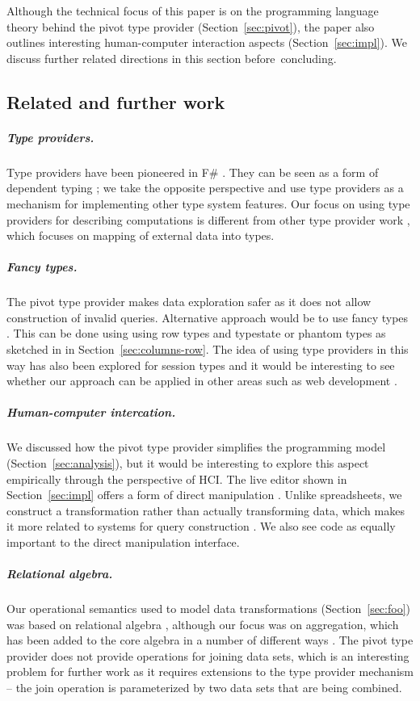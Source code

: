 \documentclass[a4paper,UKenglish]{lipics-v2016}
\theoremstyle{plain}
\theoremstyle{definition}
\begin{document}
Although the technical focus of this paper is on the programming language theory behind the pivot type
provider (Section~\ref{sec:pivot}), the paper also outlines interesting human-computer interaction 
aspects (Section~\ref{sec:impl}). We discuss further related directions in this
section before~concluding.

\subsection{Related and further work}
\label{sec:further}

\subparagraph{Type providers.}
Type providers have been pioneered in F\# \cite{inforich}. They can be seen as a form of dependent 
typing \cite{idris-tp}; we take the opposite perspective and use type providers as a mechanism for 
implementing other type system features. Our focus on using type providers for describing 
computations is different from other type provider work \cite{fsdata,liteq,ageweb}, which focuses 
on mapping of external data into types.

\subparagraph{Fancy types.}
The pivot type provider makes data exploration safer as it does not allow construction of invalid
queries. Alternative approach would be to use fancy types \cite{fancytypes}. This can be done
using using row types and typestate or phantom types \cite{rowtypes,typestate,phanty} as sketched
in in Section~\ref{sec:columns-row}. The idea of using type providers in this way has also been
explored for session types \cite{sessionty,sessiontp} and it would be interesting to see whether
our approach can be applied in other areas such as web development \cite{urweb}.

\subparagraph{Human-computer intercation.}
We discussed how the pivot type provider simplifies the programming model (Section~\ref{sec:analysis}),
but it would be interesting to explore this aspect empirically through the perspective of HCI. 
The live editor shown in Section~\ref{sec:impl} offers a form of direct manipulation 
\cite{directman,directman2,dynamicq}. Unlike spreadsheets, we construct a transformation rather than
actually transforming data, which makes it more related to systems for query construction
\cite{spreadsheetalgebra,querydirect}. We also see code as equally important to the direct 
manipulation interface.

\subparagraph{Relational algebra.}
Our operational semantics used to model data transformations (Section~\ref{sec:foo}) was based on 
relational algebra \cite{relalg,dbsys}, although our focus was on aggregation, which has been 
added to the core algebra in a number of different ways \cite{sumtables,datacube,relalg-alpha,relalg-sparql}.
The pivot type provider does not provide operations for joining data sets, which is an interesting
problem for further work as it requires extensions to the type provider mechanism -- the join
operation is parameterized by two data sets that are being combined.
\end{document}
